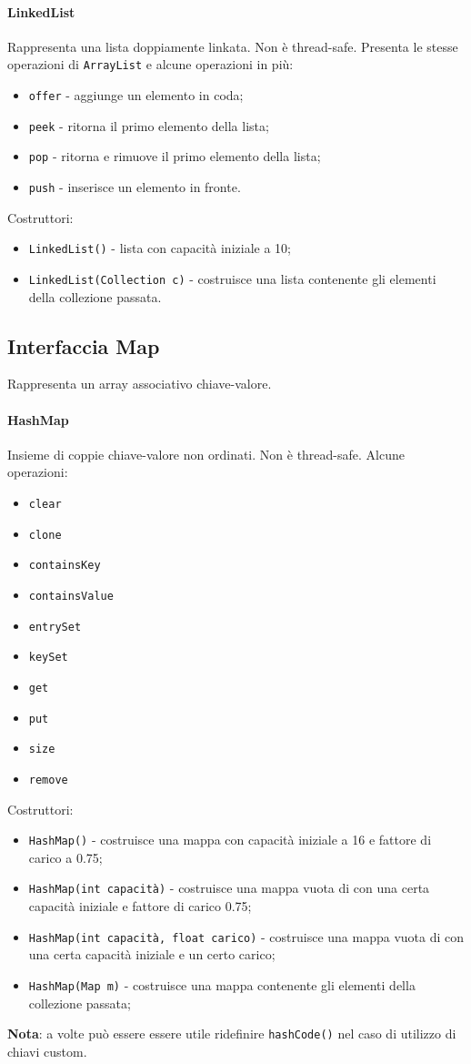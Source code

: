 \paragraph{LinkedList}
Rappresenta una lista doppiamente linkata. Non è thread-safe. Presenta le stesse operazioni di \texttt{ArrayList} e alcune operazioni in più:
\begin{itemize}
\item \texttt{offer} - aggiunge un elemento in coda;
\item \texttt{peek} - ritorna il primo elemento della lista;
\item \texttt{pop} - ritorna e rimuove il primo elemento della lista;
\item \texttt{push} - inserisce un elemento in fronte.
\end{itemize}
Costruttori:
\begin{itemize}
\item \texttt{LinkedList()} - lista con capacità iniziale a 10;
\item \texttt{LinkedList(Collection c)} - costruisce una lista contenente gli elementi della collezione passata.
\end{itemize}

\subsection{Interfaccia Map}
Rappresenta un array associativo chiave-valore.
\paragraph{HashMap}
Insieme di coppie chiave-valore non ordinati. Non è thread-safe. Alcune operazioni:
\begin{itemize}
\item \texttt{clear}
\item \texttt{clone}
\item \texttt{containsKey}
\item \texttt{containsValue}
\item \texttt{entrySet}
\item \texttt{keySet}
\item \texttt{get}
\item \texttt{put}
\item \texttt{size}
\item \texttt{remove}
\end{itemize}
Costruttori:
\begin{itemize}
\item \texttt{HashMap()} - costruisce una mappa con capacità iniziale a 16 e fattore di carico a 0.75;
\item \texttt{HashMap(int capacità)} - costruisce una mappa vuota di con una certa capacità iniziale e fattore di carico 0.75;
\item \texttt{HashMap(int capacità, float carico)} - costruisce una mappa vuota di con una certa capacità iniziale e un certo carico;
\item \texttt{HashMap(Map m)} - costruisce una mappa contenente gli elementi della collezione passata;
\end{itemize}
\textbf{Nota}: a volte può essere essere utile ridefinire \texttt{hashCode()} nel caso di utilizzo di chiavi custom.

